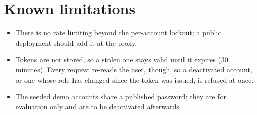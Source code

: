 \section{Known limitations}
\begin{itemize}
  \item There is no rate limiting beyond the per-account lockout; a public deployment should
    add it at the proxy.
  \item Tokens are not stored, so a stolen one stays valid until it expires (30 minutes).
    Every request re-reads the user, though, so a deactivated account, or one whose role has
    changed since the token was issued, is refused at once.
  \item The seeded demo accounts share a published password; they are for evaluation only and
    are to be deactivated afterwards.
\end{itemize}
